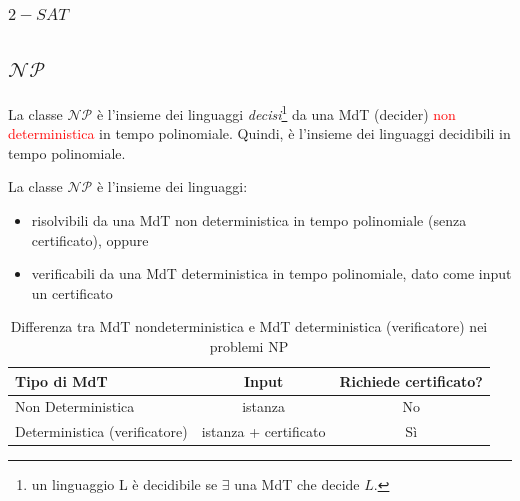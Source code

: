 \documentclass{article}  %
\theoremstyle{definition}
\begin{document}
\subsubsection{$2-SAT$}
\subsection{$\mathcal{NP}$}
La classe $\mathcal{NP}$ è l'insieme dei linguaggi \textit{decisi}\footnote{un linguaggio
	L è decidibile se $\exists$ una MdT che decide $L$.} da una MdT (decider) \textcolor{red}{non deterministica} in tempo polinomiale.
Quindi, è l'insieme dei linguaggi decidibili in tempo polinomiale.
\begin{osservazioni}[Osservazione]
	\footnotesize
	La classe $\mathcal{NP}$ è l'insieme dei linguaggi:
	\begin{itemize}
		\item risolvibili da una MdT non deterministica in tempo polinomiale (senza certificato), oppure
		\item verificabili da una MdT deterministica in tempo polinomiale, dato come input un certificato
	\end{itemize}
\end{osservazioni}
\begin{table}[h!]
	\centering
	\footnotesize
	\begin{tabular}{|l|c|c|}
		\hline
		\rowcolor{gray!30}
		\textbf{Tipo di MdT}                                & \textbf{Input}        & \textbf{Richiede certificato?} \\
		\hline
		\cellcolor{blue!15} Non Deterministica              & istanza               & No                             \\
		\hline
		\cellcolor{yellow!15} Deterministica (verificatore) & istanza + certificato & Sì                             \\
		\hline
	\end{tabular}
	\caption{Differenza tra MdT nondeterministica e MdT deterministica (verificatore) nei problemi NP}
\end{table}
\end{document}
